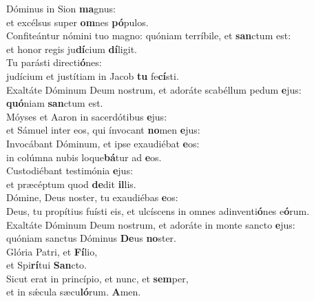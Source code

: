 \evenverse Dóminus in Sion \textbf{ma}gnus:~\*\\
\evenverse et excélsus super \textbf{om}nes \textbf{pó}pulos.\\
\oddverse Confiteántur nómini tuo magno: quóniam terríbile, et \textbf{san}ctum est:~\*\\
\oddverse et honor regis ju\textbf{dí}cium \textbf{dí}ligit.\\
\evenverse Tu parásti directi\textbf{ó}nes:~\*\\
\evenverse judícium et justítiam in Jacob \textbf{tu} fe\textbf{cí}sti.\\
\oddverse Exaltáte Dóminum Deum nostrum, et adoráte scabéllum pedum \textbf{e}jus:~\*\\
\oddverse \textbf{quó}niam \textbf{san}ctum est.\\
\evenverse Móyses et Aaron in sacerdótibus \textbf{e}jus:~\*\\
\evenverse et Sámuel inter eos, qui ínvocant \textbf{no}men \textbf{e}jus:\\
\oddverse Invocábant Dóminum, et ipse exaudiébat \textbf{e}os:~\*\\
\oddverse in colúmna nubis loque\textbf{bá}tur ad \textbf{e}os.\\
\evenverse Custodiébant testimónia \textbf{e}jus:~\*\\
\evenverse et præcéptum quod \textbf{de}dit \textbf{il}lis.\\
\oddverse Dómine, Deus noster, tu exaudiébas \textbf{e}os:~\*\\
\oddverse Deus, tu propítius fuísti eis, et ulcíscens in omnes adinventi\textbf{ó}nes e\textbf{ó}rum.\\
\evenverse Exaltáte Dóminum Deum nostrum, et adoráte in monte sancto \textbf{e}jus:~\*\\
\evenverse quóniam sanctus Dóminus \textbf{De}us \textbf{no}ster.\\
\oddverse Glória Patri, et \textbf{Fí}lio,~\*\\
\oddverse et Spi\textbf{rí}tui \textbf{San}cto.\\
\evenverse Sicut erat in princípio, et nunc, et \textbf{sem}per,~\*\\
\evenverse et in sǽcula sæcu\textbf{ló}rum. \textbf{A}men.\\
